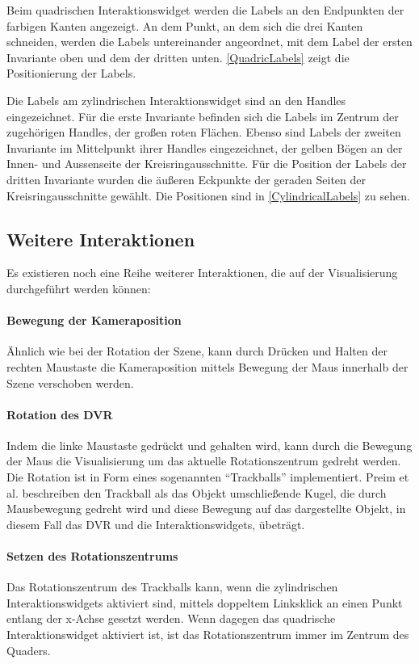 \documentclass[a4paper,fontsize=12pt,toc=bib,halfparskip,ngerman]{scrartcl}
\begin{document}
Beim quadrischen Interaktionswidget werden die Labels an den Endpunkten der farbigen Kanten angezeigt. An dem Punkt, an dem sich die drei Kanten schneiden, werden die Labels untereinander angeordnet, mit dem Label der ersten Invariante oben und dem der dritten unten. \cref{QuadricLabels} zeigt die Positionierung der Labels.

Die Labels am zylindrischen Interaktionswidget sind an den Handles eingezeichnet. F\"ur die erste Invariante befinden sich die Labels im Zentrum der zugeh\"origen Handles, der gro{\ss}en roten Fl\"achen. Ebenso sind Labels der zweiten Invariante im Mittelpunkt ihrer Handles eingezeichnet, der gelben B\"ogen an der Innen- und Aussenseite der Kreisringausschnitte. F\"ur die Position der Labels der dritten Invariante wurden die \"au{\ss}eren Eckpunkte der geraden Seiten der Kreisringausschnitte gew\"ahlt. Die Positionen sind in \cref{CylindricalLabels} zu sehen.

\subsection{Weitere Interaktionen}
Es existieren noch eine Reihe weiterer Interaktionen, die auf der Visualisierung durchgef\"uhrt werden k\"onnen:
\paragraph{Bewegung der Kameraposition}
\"Ahnlich wie bei der Rotation der Szene, kann durch Dr\"ucken und Halten der rechten Maustaste die Kameraposition mittels Bewegung der Maus innerhalb der Szene verschoben werden.
\paragraph{Rotation des DVR}
Indem die linke Maustaste gedr\"uckt und gehalten wird, kann durch die Bewegung der Maus die Visualisierung um das aktuelle Rotationszentrum gedreht werden. Die Rotation ist in Form eines sogenannten ``Trackballs'' implementiert. Preim et al. beschreiben den Trackball als das Objekt umschlie{\ss}ende Kugel, die durch Mausbewegung gedreht wird und diese Bewegung auf das dargestellte Objekt, in diesem Fall das DVR und die Interaktionswidgets, \"ubetr\"agt.
\paragraph{Setzen des Rotationszentrums}
Das Rotationszentrum des Trackballs kann, wenn die zylindrischen Interaktionswidgets aktiviert sind, mittels doppeltem Linksklick an einen Punkt entlang der x-Achse gesetzt werden. Wenn dagegen das quadrische Interaktionswidget aktiviert ist, ist das Rotationszentrum immer im Zentrum des Quaders.
\end{document}
